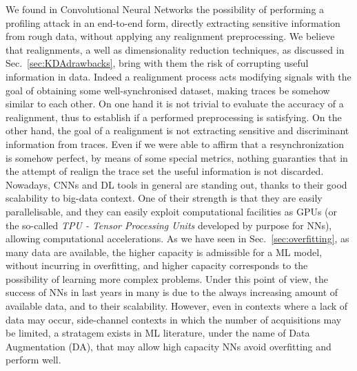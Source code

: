 We found in Convolutional Neural Networks the possibility of performing a profiling attack in an end-to-end form, directly extracting sensitive information from rough data, without applying any realignment preprocessing. We believe that realignments, a well as dimensionality reduction techniques, as discussed in Sec.~\ref{sec:KDAdrawbacks}, bring with them the risk of corrupting useful information in data. Indeed a realignment process acts modifying signals with the goal of obtaining some well-synchronised dataset, making traces be somehow similar to each other. On one hand it is not trivial to evaluate the accuracy of a realignment, thus to establish if a performed preprocessing is satisfying. On the other hand, the goal of a realignment is not extracting sensitive and discriminant information from traces. Even if we were able to affirm that a resynchronization is somehow  perfect, by means of some special metrics, nothing guaranties that in the attempt of realign the trace set the useful information is not discarded. Nowadays, CNNs and DL tools in general are standing out, thanks to their good scalability to \textquotedbl big-data \textquotedbl context. One of their strength is that they are easily parallelisable, and they can easily exploit computational facilities as GPUs (or the so-called \emph{TPU - Tensor Processing Units} developed by purpose for NNs), allowing computational accelerations. As we have seen in Sec.~\ref{sec:overfitting}, as many data are available, the higher capacity is admissible for a ML model, without incurring in overfitting, and higher capacity corresponds to the possibility of learning more complex problems. Under this point of view, the success of NNs in last years in many is due to the always increasing amount of available data, and to their scalability. However, even in contexts where a lack of data may occur, \eg side-channel contexts in which the number of acquisitions may be limited, a stratagem exists in ML literature, under the name of Data Augmentation (DA), that may allow high capacity NNs avoid overfitting and perform well. 

